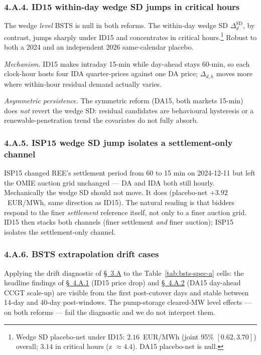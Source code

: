\documentclass[11pt]{article}
\begin{document}
\subsubsection*{4.A.4. ID15 within-day wedge SD jumps in critical hours}\label{sec:4-wedge}
The wedge \emph{level} BSTS is null in both reforms. The within-day wedge SD $\Delta^{\text{SD}}_d$, by contrast, jumps sharply under ID15 and concentrates in critical hours.\footnote{Wedge SD placebo-net under ID15: $2.16$~EUR/MWh (joint 95\% $[0.62, 3.70]$) overall; $3.14$ in critical hours (z $\approx 4.4$). DA15 placebo-net is null.} Robust to both a 2024 and an independent 2026 same-calendar placebo. 

\emph{Mechanism.} ID15 makes intraday 15-min while day-ahead stays 60-min, so each clock-hour hosts four IDA quarter-prices against one DA price; $\Delta_{d,h}$ moves more where within-hour residual demand actually varies.

\emph{Asymmetric persistence.} The symmetric reform (DA15, both markets 15-min) does \emph{not} revert the wedge SD: residual candidates are behavioural hysteresis or a renewable-penetration trend the covariates do not fully absorb.

\subsubsection*{4.A.5. ISP15 wedge SD jump isolates a settlement-only channel}\label{sec:4-wedge-isp15}
ISP15 changed REE's settlement period from 60 to 15 min on 2024-12-11 but left the OMIE auction grid unchanged --- DA and IDA both still hourly. Mechanically the wedge SD should not move. It does (placebo-net $+3.92$~EUR/MWh, same direction as ID15). The natural reading is that bidders respond to the finer \emph{settlement} reference itself, not only to a finer auction grid. ID15 then stacks both channels (finer settlement \emph{and} finer auction); ISP15 isolates the settlement-only channel.

\subsubsection*{4.A.6. BSTS extrapolation drift cases}\label{sec:4-bsts-drift}
Applying the drift diagnostic of \hyperref[sec:drift-diagnostic]{\S~3.A} to the Table~\ref{tab:bsts-spec-a} cells: the headline findings of \hyperref[sec:4ii]{\S~4.A.1} (ID15 price drop) and \hyperref[sec:4iii]{\S~4.A.2} (DA15 day-ahead CCGT scale-up) are visible from the first post-cutover days and stable between 14-day and 40-day post-windows. The pump-storage cleared-MW level effects --- on both reforms --- fail the diagnostic and we do not interpret them.
\end{document}
